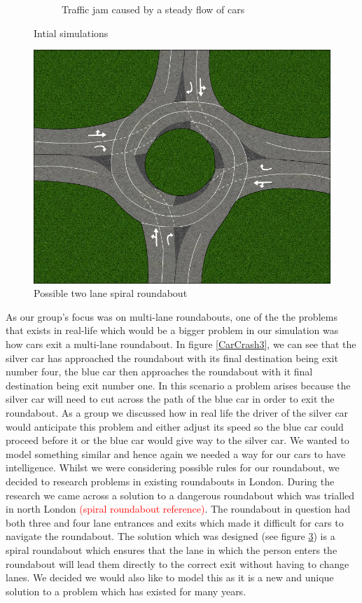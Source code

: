 \documentclass{article}
\begin{document}
\begin{figure}
\begin{subfigure}[h ]{0.5\textwidth}
        \caption{Traffic jam caused by a steady flow of cars}
        \label{steadyFlow}
    \end{subfigure}
    \caption{Intial simulations}
\end{figure}

\begin{figure}[h]
     \centering \includegraphics[width=.6\textwidth]{spiralRoundabout}
        \caption{Possible two lane spiral roundabout}
        \label{spiralRoundabout}
\end{figure}
	   
	
	As our group's focus was on multi-lane roundabouts, one of the the problems that exists in real-life which would be a bigger problem in our simulation was how cars exit a multi-lane roundabout. In figure \ref{CarCrash3}, we can see that the silver car has approached the roundabout with its final destination being exit number four, the blue car then approaches the roundabout with it final destination being exit number one. In this scenario a problem arises because the silver car will need to cut across the path of the blue car in order to exit the roundabout. As a group we discussed how in real life the driver of the silver car would anticipate this problem and either adjust its speed so the blue car could proceed before it or the blue car would give way to the silver car. We wanted to model something similar and hence again we needed a way for our cars to have intelligence. Whilst we were considering possible rules for our roundabout, we decided to research problems in existing roundabouts in London. During the research we came across a solution to a dangerous roundabout which was trialled in north London \textcolor{red}{(spiral roundabout reference)}. The roundabout in question had both three and four lane entrances and exits which made it difficult for cars to navigate the roundabout. The solution which was designed (see figure \ref{spiralRoundabout}) is a spiral roundabout which ensures that the lane in which the person enters the roundabout will lead them directly to the correct exit without having to change lanes. We decided we would also like to model this as it is a new and unique solution to a problem which has existed for many years.
	
\end{document}
